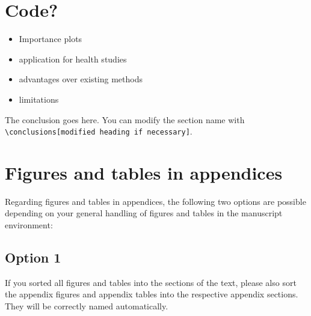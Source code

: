 \documentclass[gmd, manuscript]{copernicus}
\providecommand{\tightlist}{%
  \setlength{\itemsep}{0pt}\setlength{\parskip}{0pt}}
\begin{document}
\section{Code?}

\begin{itemize}
\tightlist
\item
  Importance plots
\item
  application for health studies
\item
  advantages over existing methods
\item
  limitations
\end{itemize}

\conclusions[Conclusions]

The conclusion goes here. You can modify the section name with
\texttt{\textbackslash{}conclusions{[}modified\ heading\ if\ necessary{]}}.







\appendix
\section{Figures and tables in appendices}

Regarding figures and tables in appendices, the following two options
are possible depending on your general handling of figures and tables in
the manuscript environment:

\subsection{Option 1}

If you sorted all figures and tables into the sections of the text,
please also sort the appendix figures and appendix tables into the
respective appendix sections. They will be correctly named
automatically.
\end{document}
